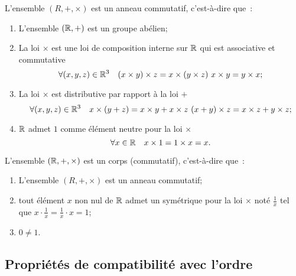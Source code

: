 \begin{prop}
  L'ensemble \((R,+,\times)\) est un anneau commutatif, c'est-à-dire que~:
  \begin{enumerate}
    \item L'ensemble \((\mathbb{R},+)\) est un groupe abélien;
    \item La loi \(\times\) est une loi de composition interne sur \(\mathbb{R}\) qui 
      est associative et commutative
      \begin{equation}
        \forall (x,y,z) \in \R^3 \quad (x\times y)\times z=x\times (y\times z) \ 
        x\times y=y\times x;
      \end{equation}
    \item La loi \(\times\) est distributive par rapport à la loi \(+\)
      \begin{equation}
        \forall (x,y,z) \in \R^3 \quad x\times(y+z)=x\times y+x\times z \ 
        (x+y)\times z=x\times z+y\times z;
      \end{equation}
    \item \(\mathbb{R}\) admet \(1\) comme élément neutre pour la loi \(\times\)
      \begin{equation}
        \forall x \in \mathbb{R} \quad x\times 1=1\times x=x.
      \end{equation}
  \end{enumerate}
\end{prop}
\begin{prop}
  L'ensemble \((\mathbb{R},+,\times)\) est un corps (commutatif), c'est-à-dire que~:
  \begin{enumerate}
    \item L'ensemble \((R,+,\times)\) est un anneau commutatif;
    \item tout élément \(x\) non nul de \(\mathbb{R}\) admet un symétrique pour la loi 
      \(\times\) noté \(\frac{1}{x}\) tel que \(x\cdot 
      \frac{1}{x}=\frac{1}{x}\cdot x=1\);
    \item \(0\neq 1\).
  \end{enumerate}
\end{prop}

\subsection{Propriétés de compatibilité avec l'ordre}

